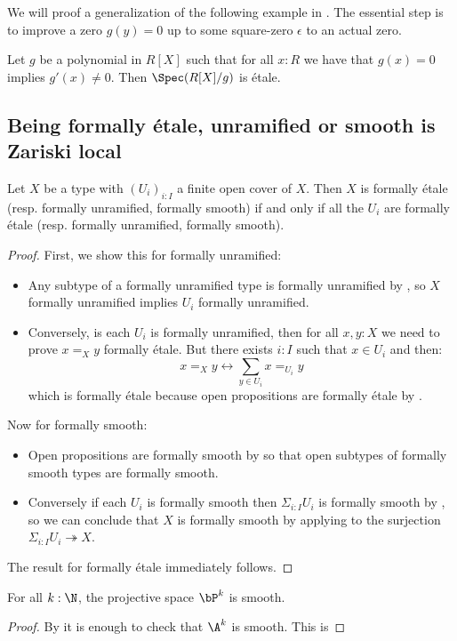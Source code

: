 We will proof a generalization of the following example in .
The essential step is to improve a zero $g(y)=0$ up to some square-zero $\epsilon$ to an actual zero.

\begin{example}
Let $g$ be a polynomial in $R[X]$ such that for all $x:R$ we have that $g(x)=0$ implies $g'(x)\not=0$. Then $\Spec(R[X]/g)$ is étale.
\end{example}


\subsection{Being formally étale, unramified or smooth is Zariski local}

\begin{lemma}\label{etale-zariski-local}
Let $X$ be a type with $(U_i)_{i:I}$ a finite open cover of $X$. Then $X$ is formally étale (resp. formally unramified, formally smooth) if and only if all the $U_i$ are formally étale (resp. formally unramified, formally smooth).
\end{lemma}

\begin{proof}
First, we show this for formally unramified:
\begin{itemize}
\item Any subtype of a formally unramified type is formally unramified by , so $X$ formally unramified implies $U_i$ formally unramified.
\item Conversely, is each $U_i$ is formally unramified, then for all $x,y:X$ we need to prove $x=_Xy$ formally étale. But there exists $i:I$ such that $x\in U_i$ and then:
\[x=_Xy \leftrightarrow \sum_{y\in U_i} x=_{U_i}y \]
which is formally étale because open propositions are formally étale by .
\end{itemize}
Now for formally smooth:
\begin{itemize}
\item Open propositions are formally smooth by  so that open subtypes of formally smooth types are formally smooth.
\item Conversely if each $U_i$ is formally smooth then $\Sigma_{i:I}U_i$ is formally smooth by , so we can conclude that $X$ is formally smooth by applying  to the surjection $\Sigma_{i:I}U_i \twoheadrightarrow X$.
\end{itemize}
The result for formally étale immediately follows.
\end{proof}

\begin{corollary}
For all $k:\N$, the projective space $\bP^k$ is smooth.
\end{corollary}

\begin{proof}
By  it is enough to check that $\A^k$ is smooth. This is 
\end{proof}





